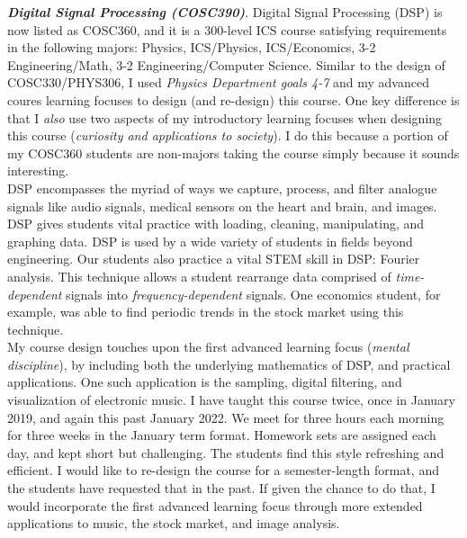 \documentclass[../../../main.tex]{subfiles}
\begin{document}
\textbf{\textit{Digital Signal Processing (COSC390)}}.  Digital Signal Processing (DSP) is now listed as COSC360, and it is a 300-level ICS course satisfying requirements in the following majors: Physics, ICS/Physics, ICS/Economics, 3-2 Engineering/Math, 3-2 Engineering/Computer Science.  Similar to the design of COSC330/PHYS306, I used \textit{Physics Department goals 4-7} and my advanced coures learning focuses to design (and re-design) this course.  One key difference is that I \textit{also} use two aspects of my introductory learning focuses when designing this course (\textit{curiosity and applications to society}).  I do this because a portion of my COSC360 students are non-majors taking the course simply because it sounds interesting.
\\
\vspace{0.25cm}
DSP encompasses the myriad of ways we capture, process, and filter analogue signals like audio signals, medical sensors on the heart and brain, and images.  DSP gives students vital practice with loading, cleaning, manipulating, and graphing data.  DSP is used by a wide variety of students in fields beyond engineering.  Our students also practice a vital STEM skill in DSP: Fourier analysis.  This technique allows a student rearrange data comprised of \textit{time-dependent} signals into \textit{frequency-dependent} signals.  One economics student, for example, was able to find periodic trends in the stock market using this technique.
\\
\vspace{0.25cm}
My course design touches upon the first advanced learning focus (\textit{mental discipline}), by including both the underlying mathematics of DSP, and practical applications.  One such application is the sampling, digital filtering, and visualization of electronic music.  I have taught this course twice, once in January 2019, and again this past January 2022.  We meet for three hours each morning for three weeks in the January term format.  Homework sets are assigned each day, and kept short but challenging.  The students find this style refreshing and efficient.  I would like to re-design the course for a semester-length format, and the students have requested that in the past.  If given the chance to do that, I would incorporate the first advanced learning focus through more extended applications to music, the stock market, and image analysis.
\\
\vspace{0.25cm}
\end{document}
